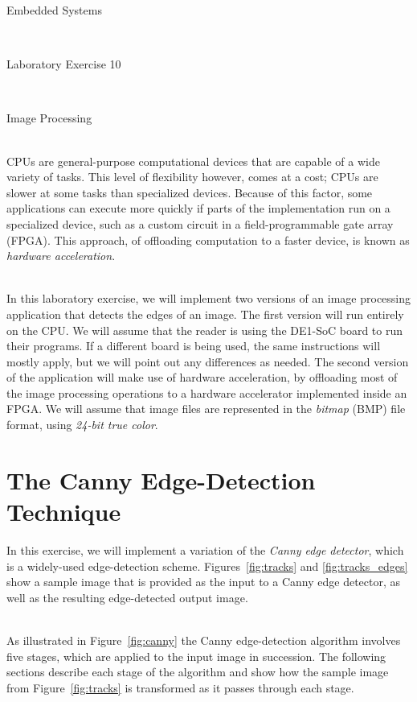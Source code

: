 \documentclass[epsfig,10pt,fullpage]{article}
\newcommand{\LabNum}{10}
\begin{document}
\centerline{\huge Embedded Systems}
~\\
\centerline{\huge Laboratory Exercise \LabNum}
~\\
\centerline{\large Image Processing}
~\\

\noindent
CPUs are general-purpose computational devices that are capable of a wide variety of tasks. 
This level of flexibility however, comes at a cost; CPUs are slower at some tasks than 
specialized devices. Because of this factor, some applications can execute more quickly if 
parts of the implementation run on a specialized device, such as a custom circuit in a
field-programmable gate array (FPGA). This approach, of offloading computation to a faster
device, is known as \textit{hardware acceleration}.

\noindent
~\\
In this laboratory exercise, we will implement two versions of an image processing application
that detects the edges of an image. The first version will run entirely on the CPU. We
will assume that the reader is using the DE1-SoC board to run their programs. If a 
different board is being used, the same instructions will mostly apply, but we will point
out any differences as needed. The second version of the application will
make use of hardware acceleration, by offloading most of the image processing operations to 
a hardware accelerator implemented inside an FPGA. We will assume that image files are 
represented in the {\it bitmap} (BMP) file format, using {\it 24-bit true color}.

\noindent
\section*{The Canny Edge-Detection Technique}

\noindent
In this exercise, we will implement a variation of the \textit{Canny edge detector}, which is 
a widely-used edge-detection scheme. Figures~\ref{fig:tracks} and \ref{fig:tracks_edges} 
show a sample image that is provided as the input to a Canny edge detector, as well as the 
resulting edge-detected output image. 

~\\
\noindent
As illustrated in Figure~\ref{fig:canny} the Canny edge-detection algorithm involves five
stages, which are applied to the input image in succession. The following 
sections describe each stage of the algorithm and show how the sample image from 
Figure~\ref{fig:tracks} is transformed as it passes through each stage.
\end{document}

